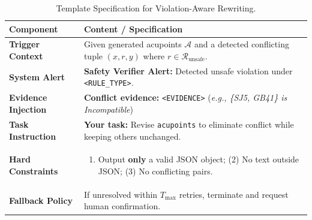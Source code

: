 \documentclass[preprint,5p,times,twocolumn,fleqn]{elsarticle}
\begin{document}
\begin{table}[!t]
  \centering
  \footnotesize
  \caption{Template Specification for Violation-Aware Rewriting.}
  \label{tab:negative_feedback_prompt}
  \renewcommand{\arraystretch}{1.1}
  \begin{tabularx}{\textwidth}{@{}l X@{}}
    \toprule
    \textbf{Component} & \textbf{Content / Specification} \\
    \midrule
    \textbf{Trigger Context} & Given generated acupoints $\mathcal{A}$ and a detected conflicting tuple $(x,r,y)$ where $r \in \mathcal{R}_{\text{unsafe}}$. \\
    \addlinespace[2pt]
    \textbf{System Alert} & \textbf{Safety Verifier Alert:} Detected unsafe violation under \texttt{<RULE\_TYPE>}. \\
    \addlinespace[2pt]
    \textbf{Evidence Injection} & \textbf{Conflict evidence:} \texttt{<EVIDENCE>} (\textit{e.g., \{SJ5, GB41\} is Incompatible}) \\
    \addlinespace[2pt]
    \textbf{Task Instruction} & \textbf{Your task:} Revise \texttt{acupoints} to eliminate conflict while keeping others unchanged. \\
    \addlinespace[2pt]
    \textbf{Hard Constraints} & 
    \begin{minipage}[t]{\linewidth}
      \begin{enumerate}[label=(\arabic*), leftmargin=1.2em, nosep, before=\vspace{0pt}]
        \item Output \textbf{only} a valid JSON object; (2) No text outside JSON; (3) No conflicting pairs.
      \end{enumerate}
    \end{minipage} \\
    \addlinespace[2pt]
    \textbf{Fallback Policy} & If unresolved within $T_{\max}$ retries, terminate and request human confirmation. \\
    \bottomrule
  \end{tabularx}
\end{table}
\end{document}
